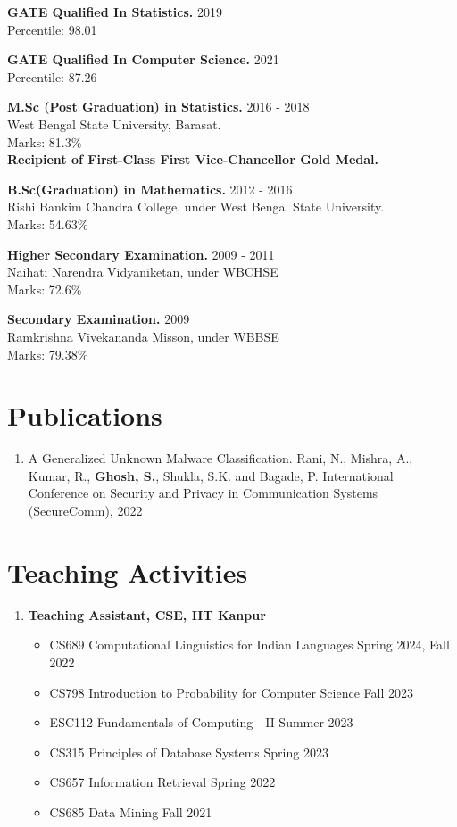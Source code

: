 \documentclass[margin,line]{res}
\begin{document}
\begin{resume}
{\bf GATE Qualified In Statistics.} \hfill{2019}\\
Percentile: 98.01

{\bf GATE Qualified In Computer Science.} \hfill{2021}\\
Percentile: 87.26

{\bf M.Sc (Post Graduation) in Statistics. } \hfill{2016 - 2018}\\
 West Bengal State University, Barasat.\\
Marks: 81.3\%\\
{\bf Recipient of First-Class First Vice-Chancellor Gold Medal.}

{\bf B.Sc(Graduation) in Mathematics.  } \hfill{2012 - 2016}\\
Rishi Bankim Chandra College, under West Bengal State University.\\
Marks: 54.63\%

{\bf Higher Secondary Examination.  } \hfill{2009 - 2011}\\
Naihati Narendra Vidyaniketan, under WBCHSE \\
Marks: 72.6\%


{\bf Secondary Examination. } \hfill{ 2009}\\
Ramkrishna Vivekananda Misson, under WBBSE\\
Marks: 79.38\%

\section{\sc Publications}
\begin{enumerate}
    \item
    A Generalized Unknown Malware Classification. Rani, N., Mishra, A., Kumar, R., \textbf{Ghosh, S.}, Shukla, S.K. and Bagade, P. International Conference on Security and Privacy in Communication Systems (SecureComm), 2022
\end{enumerate}


\section{\sc Teaching Activities}
\begin{enumerate}
\item
{\bf Teaching Assistant, CSE, IIT Kanpur} \hfill{}
\begin{itemize}
    \item
    CS689 Computational Linguistics for Indian Languages \hfill{Spring 2024, Fall 2022}
    \item
    CS798 Introduction to Probability for Computer Science \hfill{Fall 2023}
    \item
    ESC112 Fundamentals of Computing - II \hfill{Summer 2023}
    \item
    CS315 Principles of Database Systems \hfill{Spring 2023}
    \item 
    CS657 Information Retrieval \hfill{Spring 2022}
    \item 
    CS685 Data Mining \hfill{Fall 2021}
\end{itemize}


\end{enumerate}
\end{resume}
\end{document}
